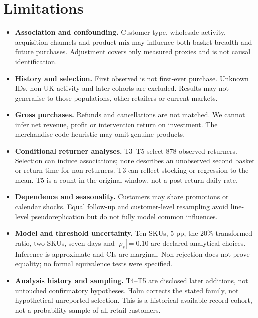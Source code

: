 \documentclass[10pt,a4paper,twocolumn]{article}
\begin{document}
\section{Limitations}
\begin{itemize}
\item \textbf{Association and confounding.} Customer type, wholesale activity, acquisition channels and product mix may influence both basket breadth and future purchases. Adjustment covers only measured proxies and is not causal identification.
\item \textbf{History and selection.} First observed is not first-ever purchase. Unknown IDs, non-UK activity and later cohorts are excluded. Results may not generalise to those populations, other retailers or current markets.
\item \textbf{Gross purchases.} Refunds and cancellations are not matched. We cannot infer net revenue, profit or intervention return on investment. The merchandise-code heuristic may omit genuine products.
\item \textbf{Conditional returner analyses.} T3--T5 select 878 observed returners. Selection can induce associations; none describes an unobserved second basket or return time for non-returners. T3 can reflect stocking or regression to the mean. T5 is a count in the original window, not a post-return daily rate.
\item \textbf{Dependence and seasonality.} Customers may share promotions or calendar shocks. Equal follow-up and customer-level resampling avoid line-level pseudoreplication but do not fully model common influences.
\item \textbf{Model and threshold uncertainty.} Ten SKUs, 5 pp, the 20\% transformed ratio, two SKUs, seven days and $|\rho_s|=0.10$ are declared analytical choices. Inference is approximate and CIs are marginal. Non-rejection does not prove equality; no formal equivalence tests were specified.
\item \textbf{Analysis history and sampling.} T4--T5 are disclosed later additions, not untouched confirmatory hypotheses. Holm corrects the stated family, not hypothetical unreported selection. This is a historical available-record cohort, not a probability sample of all retail customers.
\end{itemize}
\end{document}
